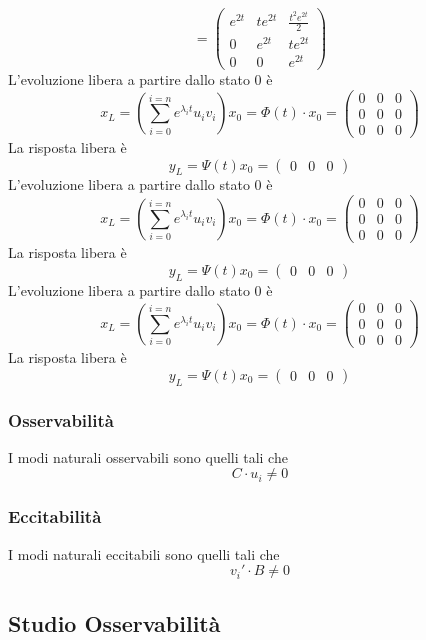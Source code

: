 \documentclass{article}
\begin{document}
\[ = \left(\begin{matrix}e^{2 t} & t e^{2 t} & \frac{t^{2} e^{2 t}}{2}\\0 & e^{2 t} & t e^{2 t}\\0 & 0 & e^{2 t}\end{matrix}\right) \]L'evoluzione libera  a partire dallo stato $ 0 $ è \[ x_L = (\sum_{i=0}^{i=n} e^{\lambda_i t}u_i v_i)x_0=\Phi(t) \cdot x_0 = \left(\begin{matrix}0 & 0 & 0\\0 & 0 & 0\\0 & 0 & 0\end{matrix}\right) \]
La risposta libera è \[ y_L = \Psi(t) x_0 = \left(\begin{matrix}0 & 0 & 0\end{matrix}\right) \]
L'evoluzione libera  a partire dallo stato $ 0 $ è \[ x_L = (\sum_{i=0}^{i=n} e^{\lambda_i t}u_i v_i)x_0=\Phi(t) \cdot x_0 = \left(\begin{matrix}0 & 0 & 0\\0 & 0 & 0\\0 & 0 & 0\end{matrix}\right) \]
La risposta libera è \[ y_L = \Psi(t) x_0 = \left(\begin{matrix}0 & 0 & 0\end{matrix}\right) \]
L'evoluzione libera  a partire dallo stato $ 0 $ è \[ x_L = (\sum_{i=0}^{i=n} e^{\lambda_i t}u_i v_i)x_0=\Phi(t) \cdot x_0 = \left(\begin{matrix}0 & 0 & 0\\0 & 0 & 0\\0 & 0 & 0\end{matrix}\right) \]
La risposta libera è \[ y_L = \Psi(t) x_0 = \left(\begin{matrix}0 & 0 & 0\end{matrix}\right) \]
\subsubsection{Osservabilità}
 I modi naturali osservabili sono quelli tali che 
\[ C \cdot u_i   \neq 0\]
\subsubsection{Eccitabilità}
 I modi naturali eccitabili sono quelli tali che 
\[v_i' \cdot B \neq 0\]

\subsection{Studio Osservabilità}
\end{document}
